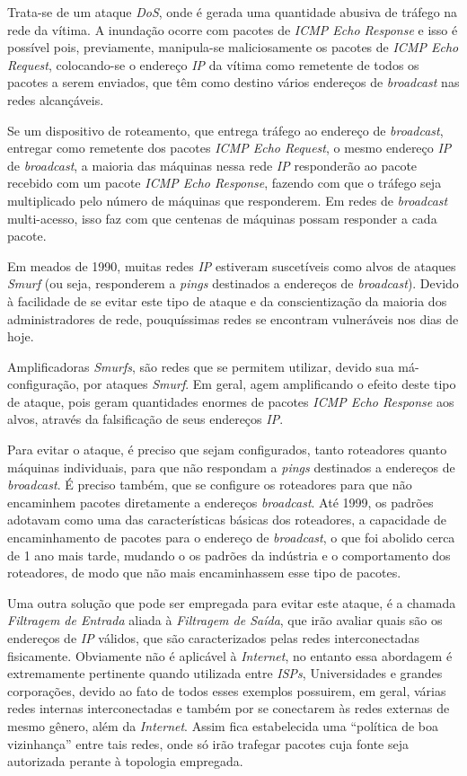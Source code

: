 Trata-se de um ataque \textit{DoS}, onde é gerada uma quantidade abusiva de tráfego na rede da vítima. A inundação ocorre com pacotes de \textit{ICMP Echo Response} e isso é possível pois, previamente, manipula-se maliciosamente os pacotes de \textit{ICMP Echo Request}, colocando-se o endereço \textit{IP} da vítima como remetente de todos os pacotes a serem enviados, que têm como destino vários endereços de \textit{broadcast} nas redes alcançáveis.

Se um dispositivo de roteamento, que entrega tráfego ao endereço de \textit{broadcast}, entregar como remetente dos pacotes \textit{ICMP Echo Request}, o mesmo endereço \textit{IP} de \textit{broadcast}, a maioria das máquinas nessa rede \textit{IP} responderão ao pacote recebido com um pacote \textit{ICMP Echo Response}, fazendo com que o tráfego seja multiplicado pelo número de máquinas que responderem. Em redes de \textit{broadcast} multi-acesso, isso faz com que centenas de máquinas possam responder a cada pacote.

Em meados de 1990, muitas redes \textit{IP} estiveram suscetíveis como alvos de ataques \textit{Smurf} (ou seja, responderem a \textit{pings} destinados a endereços de \textit{broadcast}). Devido à facilidade de se evitar este tipo de ataque e da conscientização da maioria dos administradores de rede, pouquíssimas redes se encontram vulneráveis nos dias de hoje.

Amplificadoras \textit{Smurfs}, são redes que se permitem utilizar, devido sua má-configuração, por ataques \textit{Smurf}. Em geral, agem amplificando o efeito deste tipo de ataque, pois geram quantidades enormes de pacotes \textit{ICMP Echo Response} aos alvos, através da falsificação de seus endereços \textit{IP}.

Para evitar o ataque, é preciso que sejam configurados, tanto roteadores quanto máquinas individuais, para que não respondam a \textit{pings} destinados a endereços de \textit{broadcast}. É preciso também, que se configure os roteadores para que não encaminhem pacotes diretamente a endereços \textit{broadcast}. Até 1999, os padrões adotavam como uma das características básicas dos roteadores, a capacidade de encaminhamento de pacotes para o endereço de \textit{broadcast}, o que foi abolido cerca de 1 ano mais tarde, mudando o os padrões da indústria e o comportamento dos roteadores, de modo que não mais encaminhassem esse tipo de pacotes.

Uma outra solução que pode ser empregada para evitar este ataque, é a chamada \textit{Filtragem de Entrada} aliada à \textit{Filtragem de Saída}, que irão avaliar quais são os endereços de \textit{IP} válidos, que são caracterizados pelas redes interconectadas fisicamente. Obviamente não é aplicável à \textit{Internet}, no entanto essa abordagem é extremamente pertinente quando utilizada entre \textit{ISPs}, Universidades e grandes corporações, devido ao fato de todos esses exemplos possuirem, em geral, várias redes internas interconectadas e também por se conectarem às redes externas de mesmo gênero, além da \textit{Internet}. Assim fica estabelecida uma ``política de boa vizinhança'' entre tais redes, onde só irão trafegar pacotes cuja fonte seja autorizada perante à topologia empregada.


